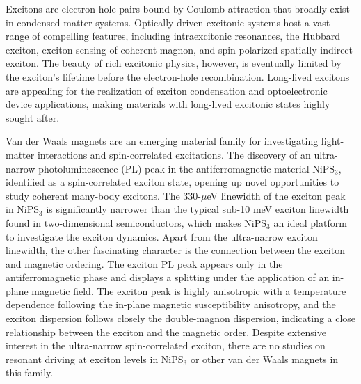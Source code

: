 \documentclass[%
 reprint,
superscriptaddress,
 amsmath,amssymb,
 aps,
]{revtex4-2}
\begin{document}
\maketitle
Excitons are electron-hole pairs bound by Coulomb attraction that broadly exist in condensed matter systems. Optically driven excitonic systems host a vast range of compelling features, including intraexcitonic resonances\cite{Kaindl2003}, the Hubbard exciton\cite{Mehio2023}, exciton sensing of coherent magnon\cite{Bae2022}, and spin-polarized spatially indirect exciton\cite{Mori2023}. The beauty of rich excitonic physics, however, is eventually limited by the exciton's lifetime before the electron-hole recombination. Long-lived excitons are appealing for the realization of exciton condensation\cite{Eisenstein2014,Kogar2017,Haque2024} and optoelectronic device applications\cite{Mak2016}, making materials with long-lived excitonic states highly sought after.     


Van der Waals magnets are an emerging material family for investigating light-matter interactions and spin-correlated excitations\cite{Kang2020,Wang2021,Hwangbo2021, Kim2023, Dirnberger2022,Afanasiev2021,Belvin2021,Ergeçen2022,Mai2021,Lee2016,Tan2022}. The discovery of an ultra-narrow photoluminescence (PL) peak in the antiferromagnetic material NiPS$_3$, identified as a spin-correlated exciton state, opening up novel opportunities to study coherent many-body excitons\cite{Kang2020, Jana, Dirnberger2022, Klaproth2023}. The 330-$\mu$eV linewidth of the exciton peak in NiPS$_3$\cite{Wang2021,Hwangbo2021} is significantly narrower than the typical sub-10 meV exciton linewidth found in two-dimensional semiconductors\cite{Ross2013,Cadiz2017,Wierzbowski2017}, which makes NiPS$_3$ an ideal platform to investigate the exciton dynamics. Apart from the ultra-narrow exciton linewidth, the other fascinating character is the connection between the exciton and magnetic ordering. The exciton PL peak appears only in the antiferromagnetic phase\cite{Wang2021,Hwangbo2021,Kim2023} and displays a splitting under the application of an in-plane magnetic field\cite{Jana, Wang2024}. The exciton peak is highly anisotropic with a temperature dependence following the in-plane magnetic susceptibility anisotropy\cite{Hwangbo2021}, and the exciton dispersion follows closely the double-magnon dispersion\cite{He2024}, indicating a close relationship between the exciton and the magnetic order. Despite extensive interest in the ultra-narrow spin-correlated exciton, there are no studies on resonant driving at exciton levels in NiPS$_3$ or other van der Waals magnets in this family.
\end{document}
